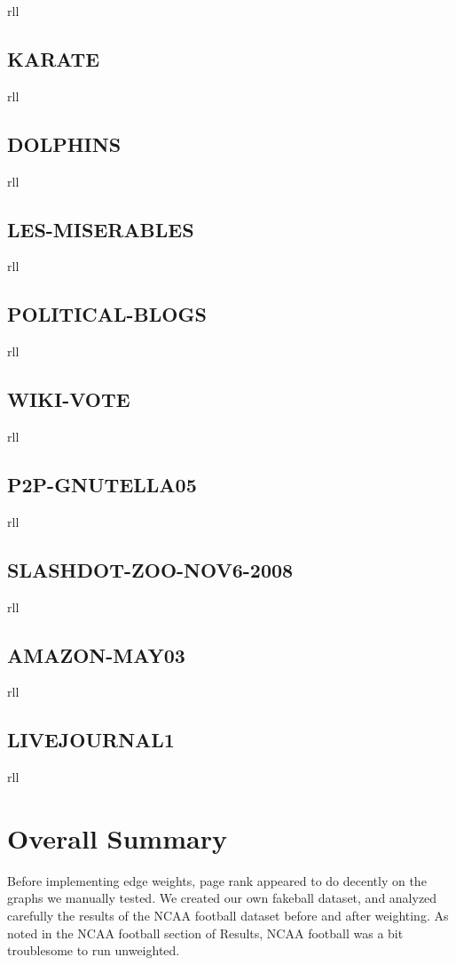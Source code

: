 \documentclass{report}
\newcommand{\results}[1]{\begin{longtabu}{rll}
                           
                         \end{longtabu}\clearpage}
\begin{document}
\results{NCAA_football-results.tex}
\subsection{KARATE}
\results{karate-results.tex}
\subsection{DOLPHINS}
\results{dolphins-results.tex}
\subsection{LES-MISERABLES}
\results{lesmis-results.tex}
%
\subsection{POLITICAL-BLOGS}
\results{polblogs-results.tex}
\subsection{WIKI-VOTE}
\results{wiki-Vote-results.tex}
\subsection{P2P-GNUTELLA05}
\results{p2p-Gnutella05-results.tex}
\subsection{SLASHDOT-ZOO-NOV6-2008}
\results{soc-sign-Slashdot081106-results.tex}
\subsection{AMAZON-MAY03}
\results{amazon0505-results.tex}
\subsection{LIVEJOURNAL1}
\results{soc-LiveJournal1-results.tex}

\section{Overall Summary}
Before implementing edge weights, page rank appeared to do decently on the
graphs we manually tested. We created our own fakeball dataset, and analyzed
carefully the results of the NCAA football dataset before and after weighting.
As noted in the NCAA football section of Results, NCAA football was a bit
troublesome to run unweighted.
\end{document}
